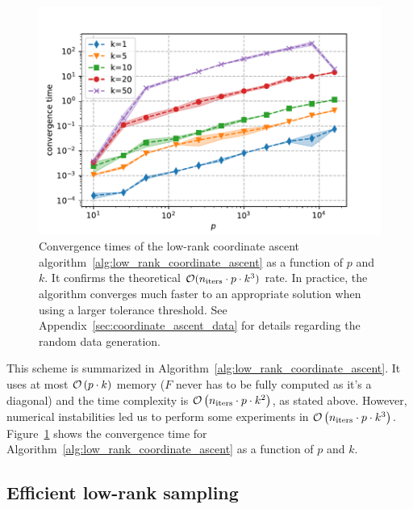 \begin{figure}
    \centering
    \includegraphics[width=0.8\linewidth, height=0.5\linewidth]{figures/low_rank_times.pdf}
    \caption{
        Convergence times of the low-rank coordinate ascent algorithm~\ref{alg:low_rank_coordinate_ascent}
        as a function of $p$ and $k$.
        It confirms the theoretical $\mathcal{O}(n_{\text{iters}} \cdot p \cdot k^3)$ rate.
        In practice,
        the algorithm converges much faster to an appropriate solution when using a larger tolerance threshold.
        See Appendix~\ref{sec:coordinate_ascent_data} for details regarding the random data generation.
    }
    \label{fig:low_rank_times}
\end{figure}

This scheme is summarized in Algorithm~\ref{alg:low_rank_coordinate_ascent}.
It uses at most $\mathcal{O}\left( p \cdot k \right)$ memory ($F$ never has to be fully computed as it's a diagonal)
and the time complexity is $\mathcal{O}\left( n_\text{iters} \cdot p \cdot k^2 \right)$, as stated above.
However, numerical instabilities led us to perform some experiments in $\mathcal{O}\left( n_\text{iters} \cdot p \cdot k^3 \right)$.
Figure~\ref{fig:low_rank_times} shows the convergence time for Algorithm~\ref{alg:low_rank_coordinate_ascent} as
a function of $p$ and $k$.

\subsection{Efficient low-rank sampling}\label{subsec:low_rank_sampling}

